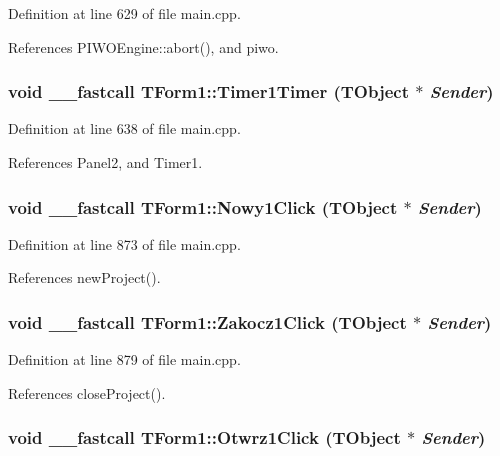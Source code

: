 Definition at line 629 of file main.cpp.

References PIWOEngine::abort(), and piwo.\hypertarget{classTForm1_bc9c59c8c54a39ff8b9a8b1a8facdfde}{
\subsubsection[Timer1Timer]{\setlength{\rightskip}{0pt plus 5cm}void \_\-\_\-fastcall TForm1::Timer1Timer (TObject $\ast$ {\em Sender})}}
\label{classTForm1_bc9c59c8c54a39ff8b9a8b1a8facdfde}




Definition at line 638 of file main.cpp.

References Panel2, and Timer1.\hypertarget{classTForm1_49836e6b4443972a738957868beb5894}{
\subsubsection[Nowy1Click]{\setlength{\rightskip}{0pt plus 5cm}void \_\-\_\-fastcall TForm1::Nowy1Click (TObject $\ast$ {\em Sender})}}
\label{classTForm1_49836e6b4443972a738957868beb5894}




Definition at line 873 of file main.cpp.

References newProject().\hypertarget{classTForm1_6ecd2685a5128166bd573ff3ebe1b37d}{
\subsubsection[Zakocz1Click]{\setlength{\rightskip}{0pt plus 5cm}void \_\-\_\-fastcall TForm1::Zakocz1Click (TObject $\ast$ {\em Sender})}}
\label{classTForm1_6ecd2685a5128166bd573ff3ebe1b37d}




Definition at line 879 of file main.cpp.

References closeProject().\hypertarget{classTForm1_f63d66a27ca087cc5997b90fe1e2cec0}{
\subsubsection[Otwrz1Click]{\setlength{\rightskip}{0pt plus 5cm}void \_\-\_\-fastcall TForm1::Otwrz1Click (TObject $\ast$ {\em Sender})}}
\label{classTForm1_f63d66a27ca087cc5997b90fe1e2cec0}




